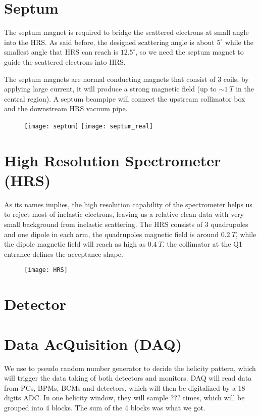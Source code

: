 \section{Septum}
The septum magnet is required to bridge the scattered electrons at small angle
into the HRS. As said before, the designed scattering angle is about $5^\circ$
while the smallest angle that HRS can reach is $12.5^\circ$, so we need the septum
magnet to guide the scattered electrons into HRS. 

The septum magnets are normal conducting magnets that consist of 3 coils, 
by applying large current, it will produce a
strong magnetic field (up to $\sim 1 \ T$ in the central region). A septum beampipe
will connect the upstream collimator box and the downstream HRS vacuum pipe.

\begin{figure}[h!]
    \texttt{[image: septum]}
    \texttt{[image: septum\_real]}
\end{figure}

\section{High Resolution Spectrometer (HRS)}
As its names implies, the high resolution capability of the spectrometer helps
us to reject most of inelastic electrons, leaving us a relative clean data with
very small background from inelastic scattering. The HRS consists of 3 quadrupoles 
and one dipole in each arm, the quadrupoles magnetic field is around $0.2 \ T$,
while the dipole magnetic field will reach as high as $0.4 \ T$.
the collimator at the Q1 entrance defines the acceptance shape.
\begin{figure}[h!]
    \centering
    \texttt{[image: HRS]}
\end{figure}

\section{Detector}

\section{Data AcQuisition (DAQ)}
We use to pseudo random number generator to decide the helicity pattern, which
will trigger the data taking of both detectors and monitors. DAQ will read data
from PCs, BPMs, BCMs and detectors, which will then be digitalized by a 18 digits
ADC. In one helicity window, they will sample ??? times, which will be grouped
into 4 blocks. The sum of the 4 blocks was what we got.

